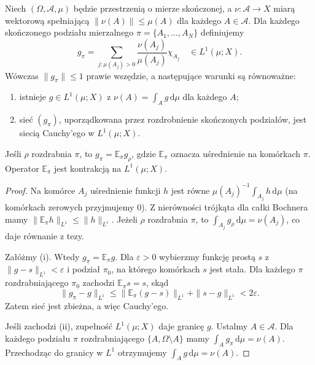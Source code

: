 \begin{lemat}
\label{lem:rnp-partition-30}
Niech $(\Omega,\mathcal A,\mu)$ będzie przestrzenią
o mierze skończonej, a $\nu:\mathcal A\to X$ miarą
wektorową spełniającą $\|\nu(A)\|\le\mu(A)$
dla każdego $A\in\mathcal A$.
Dla każdego skończonego podziału mierzalnego
$\pi=\{A_1,\ldots,A_N\}$ definiujemy
\[
 g_\pi=\sum_{j:\mu(A_j)>0}
 \frac{\nu(A_j)}{\mu(A_j)}\chi_{A_j}
 \quad\in L^1(\mu;X).
\]
Wówczas $\|g_\pi\|\le1$ prawie wszędzie,
a następujące warunki są równoważne:
\begin{enumerate}[label=(\roman*)]
 \item istnieje $g\in L^1(\mu;X)$ z
       $\nu(A)=\int_Ag\,\mathrm d\mu$ dla każdego $A$;
 \item sieć $(g_\pi)$, uporządkowana przez
       rozdrobnienie skończonych podziałów,
       jest siecią Cauchy'ego w $L^1(\mu;X)$.
\end{enumerate}
Jeśli $\rho$ rozdrabnia $\pi$, to
$g_\pi=\mathbb E_\pi g_\rho$, gdzie
$\mathbb E_\pi$ oznacza uśrednienie na komórkach
$\pi$. Operator $\mathbb E_\pi$ jest kontrakcją
na $L^1(\mu;X)$.
\end{lemat}
\begin{proof}
Na komórce $A_j$ uśrednienie funkcji $h$ jest równe
$\mu(A_j)^{-1}\int_{A_j}h\,\mathrm d\mu$
(na komórkach zerowych przyjmujemy $0$).
Z nierówności trójkąta dla całki Bochnera mamy
$\|\mathbb E_\pi h\|_{L^1}\le\|h\|_{L^1}$.
Jeżeli $\rho$ rozdrabnia $\pi$, to
$\int_{A_j}g_\rho\,\mathrm d\mu=\nu(A_j)$,
co daje równanie z tezy.

Załóżmy (i). Wtedy $g_\pi=\mathbb E_\pi g$.
Dla $\varepsilon>0$ wybierzmy funkcję prostą
$s$ z $\|g-s\|_{L^1}<\varepsilon$ i podział
$\pi_0$, na którego komórkach $s$ jest stała.
Dla każdego $\pi$ rozdrabniającego $\pi_0$
zachodzi $\mathbb E_\pi s=s$, skąd
\[
 \|g_\pi-g\|_{L^1}
 \le\|\mathbb E_\pi(g-s)\|_{L^1}+\|s-g\|_{L^1}
 <2\varepsilon.
\]
Zatem sieć jest zbieżna, a więc Cauchy'ego.

Jeśli zachodzi (ii), zupełność $L^1(\mu;X)$
daje granicę $g$. Ustalmy $A\in\mathcal A$.
Dla każdego podziału $\pi$ rozdrabniającego
$\{A,\Omega\setminus A\}$ mamy
$\int_Ag_\pi\,\mathrm d\mu=\nu(A)$.
Przechodząc do granicy w $L^1$ otrzymujemy
$\int_Ag\,\mathrm d\mu=\nu(A)$.
\end{proof}

